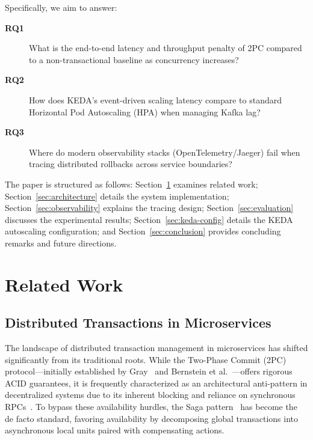 Specifically, we aim to answer:
\begin{description}
  \item[\textbf{RQ1}] What is the end-to-end latency and throughput penalty of 2PC compared to a non-transactional baseline as concurrency increases?
  \item[\textbf{RQ2}] How does KEDA’s event-driven scaling latency compare to standard Horizontal Pod Autoscaling (HPA) when managing Kafka lag?
  \item[\textbf{RQ3}] Where do modern observability stacks (OpenTelemetry/Jaeger) fail when tracing distributed rollbacks across service boundaries?
\end{description}

The paper is structured as follows:
Section~\ref{sec:related-work} examines related work;
Section~\ref{sec:architecture} details the system implementation;
Section~\ref{sec:observability} explains the tracing design;
Section~\ref{sec:evaluation} discusses the experimental results;
Section~\ref{sec:keda-config} details the KEDA autoscaling configuration; and 
Section~\ref{sec:conclusion} provides concluding remarks and future directions.


\section{Related Work}
\label{sec:related-work}

\subsection{Distributed Transactions in Microservices}
\label{subsec:rw-transactions}
The landscape of distributed transaction management in microservices has shifted significantly from its traditional roots. While the Two-Phase Commit (2PC) protocol—initially established by Gray~\cite{gray1978notes} and Bernstein et al.~\cite{bernstein1987concurrency}—offers rigorous ACID guarantees, it is frequently characterized as an architectural anti-pattern in decentralized systems due to its inherent blocking and reliance on synchronous RPCs~\cite{helland2007life}. To bypass these availability hurdles, the Saga pattern~\cite{garcia1987sagas} has become the de facto standard, favoring availability by decomposing global transactions into asynchronous local units paired with compensating actions. 

